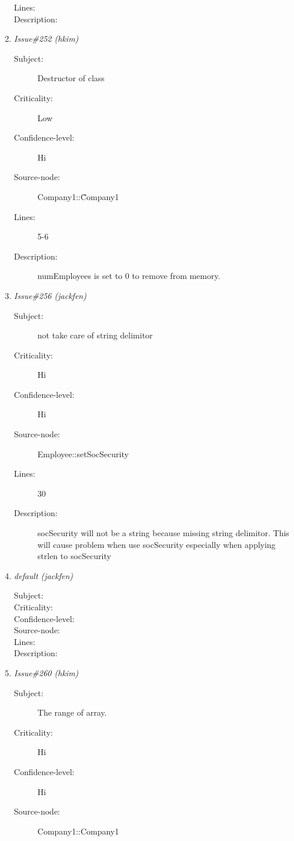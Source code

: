\begin{enumerate}
\begin{description}
\item [Lines:] 

\item [Description:] 
\end{description}
\item {\it Issue\#252 (hkim)}
\begin{description}
\item [Subject:] Destructor of class
\item [Criticality:] Low
\item [Confidence-level:] Hi
\item [Source-node:] Company1::\~Company1

\item [Lines:] 5-6

\item [Description:] numEmployees is set to 0 to remove from memory.
\end{description}
\item {\it Issue\#256 (jackfen)}
\begin{description}
\item [Subject:] not take care of string delimitor
\item [Criticality:] Hi
\item [Confidence-level:] Hi
\item [Source-node:] Employee::setSocSecurity

\item [Lines:] 30

\item [Description:] socSecurity will not be a string because
missing string delimitor.  This will cause problem when use socSecurity especially when
applying strlen to socSecurity
\end{description}
\item {\it default (jackfen)}
\begin{description}
\item [Subject:] 
\item [Criticality:] 
\item [Confidence-level:] 
\item [Source-node:] 

\item [Lines:] 

\item [Description:] 
\end{description}
\item {\it Issue\#260 (hkim)}
\begin{description}
\item [Subject:] The range of array.
\item [Criticality:] Hi
\item [Confidence-level:] Hi
\item [Source-node:] Company1::Company1


\end{description}
\end{enumerate}
